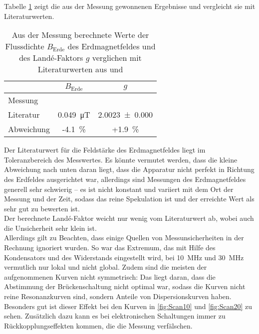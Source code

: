 Tabelle \ref{tab:Ergebnisse} zeigt die aus der Messung gewonnenen Ergebnisse und vergleicht sie mit Literaturwerten.

\begin{table}[h!]
	\centering
	\caption{Aus der Messung berechnete Werte der Flussdichte $B_\text{Erde}$ des Erdmagnetfeldes und des Landé-Faktors $g$ verglichen mit Literaturwerten aus \cite{BErde} und \cite{gFaktor}}
	\label{tab:Ergebnisse}
	\begin{tabular}{l|cc}
		& $B_\text{Erde}$ & $g$ \\
		\hline
		Messung &  &  \\
		Literatur & \SI{0.049}{\micro\tesla} & \SI{2.0023(0)}{} \\
		\hline
		Abweichung & -\SI{4.1}{\%} & +\SI{1.9}{\%}
	\end{tabular}
\end{table}

Der Literaturwert für die Feldstärke des Erdmagnetfeldes liegt im Toleranzbereich des Messwertes. Es könnte vermutet werden, dass die kleine Abweichung nach unten daran liegt, dass die Apparatur nicht perfekt in Richtung des Erdfeldes ausgerichtet war, allerdings sind Messungen des Erdmagnetfeldes generell sehr schwierig -- es ist nicht konstant und variiert mit dem Ort der Messung und der Zeit, sodass das reine Spekulation ist und der erreichte Wert als sehr gut zu bewerten ist. \\
Der berechnete Landé-Faktor weicht nur wenig vom Literaturwert ab, wobei auch die Unsicherheit sehr klein ist. \\
Allerdings gilt zu Beachten, dass einige Quellen von Messunsicherheiten in der Rechnung ignoriert wurden. So war das Extremum, das mit Hilfe des Kondensators und des Widerstands eingestellt wird, bei \SI{10}{\mega\hertz} und \SI{30}{\mega\hertz} vermutlich nur lokal und nicht global. Zudem sind die meisten der aufgenommenen Kurven nicht symmetrisch: Das liegt daran, dass die Abstimmung der Brückenschaltung nicht optimal war, sodass die Kurven nicht reine Resonanzkurven sind, sondern Anteile von Dispersionskurven haben. Besonders gut ist dieser Effekt bei den Kurven in \ref{fig:Scan10} und \ref{fig:Scan20} zu sehen. Zusätzlich dazu kann es bei elektronischen Schaltungen immer zu Rückkopplungseffekten kommen, die die Messung verfälschen.
